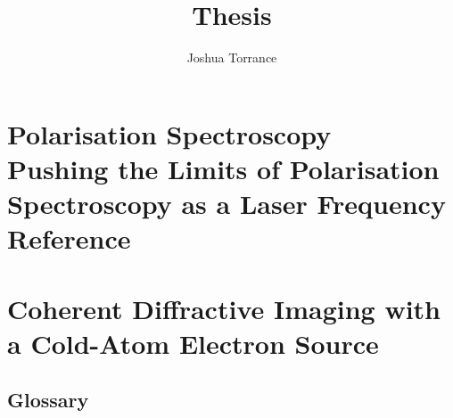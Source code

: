 \documentclass[11pt]{report}
\begin{document}
\title{Thesis}

\author{Joshua Torrance}

\maketitle






\tableofcontents


\part[Polarisation Spectroscopy]{Polarisation Spectroscopy\\
\vspace{1cm}
\LARGE Pushing the Limits of Polarisation Spectroscopy as a Laser Frequency Reference}


\part{Coherent Diffractive Imaging with a Cold-Atom Electron Source}

\appendix
\chapter{Glossary}
\printglossary


\renewcommand\bibname{References}

\end{document}
